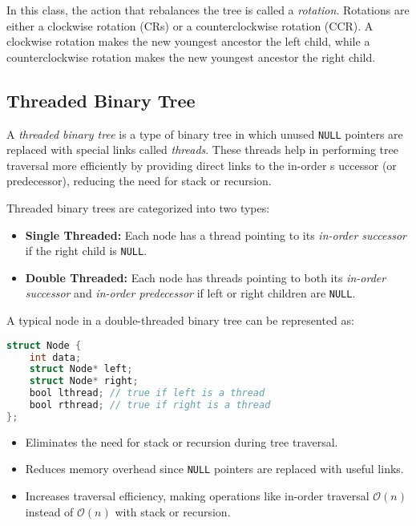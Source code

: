 In this class, the action that rebalances the tree is called a \emph{rotation}.
Rotations are either a clockwise rotation (CRs) or a counterclockwise rotation
(CCR). A clockwise rotation makes the new youngest ancestor the left child,
while a counterclockwise rotation makes the new youngest ancestor the right child.

\subsection{Threaded Binary Tree}
A \emph{threaded binary tree} is a type of binary tree in
which unused \texttt{NULL} pointers are replaced with special
links called \emph{threads}. These threads help in performing tree
traversal more efficiently by providing direct links to the in-order s
uccessor (or predecessor), reducing the need for stack or recursion.

Threaded binary trees are categorized into two types:

\begin{itemize}
    \item \textbf{Single Threaded:} Each node has a thread pointing to its \textit{in-order successor} if the right child is \texttt{NULL}.
    \item \textbf{Double Threaded:} Each node has threads pointing to both its \textit{in-order successor} and \textit{in-order predecessor} if left or right children are \texttt{NULL}.
\end{itemize}

A typical node in a double-threaded binary tree can be represented as:

\begin{lstlisting}[language=C]
struct Node {
    int data;
    struct Node* left;
    struct Node* right;
    bool lthread; // true if left is a thread
    bool rthread; // true if right is a thread
};
\end{lstlisting}

\begin{itemize}
    \item Eliminates the need for stack or recursion during tree traversal.
    \item Reduces memory overhead since \texttt{NULL} pointers are replaced with useful links.
    \item Increases traversal efficiency, making operations like in-order traversal \(\mathcal{O}(n)\) instead of \(\mathcal{O}(n)\) with stack or recursion.
\end{itemize}

